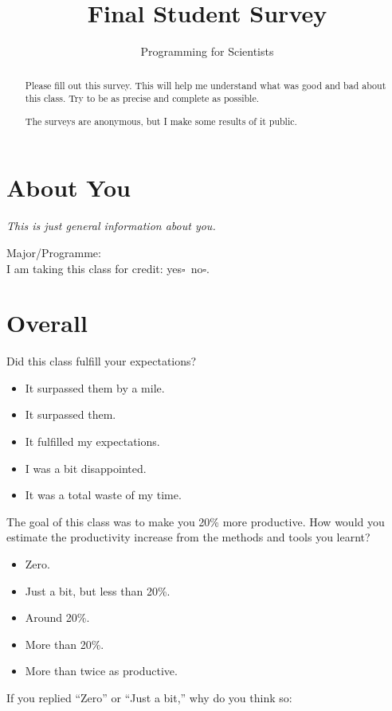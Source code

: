 \documentclass[article,twoside]{memoir}
\title{Final Student Survey}
\author{Programming for Scientists}
\newcommand*{\fillunderscore}{~\hrulefill}
\newcommand*{\checkbox}{$\square$}
\newcommand*{\yesno}{\hfill\mbox{yes\checkbox~no\checkbox}}
\newcommand{\header}[1]{\textsl{#1}}
\begin{document}
\maketitle
\begin{abstract}
Please fill out this survey. This will help me understand what was good and bad about this class. Try to be as precise and complete as possible.

The surveys are anonymous, but I make some results of it public.
\end{abstract}

\chapter{About You}

\header{This is just general information about you.}

Major/Programme: \fillunderscore\\
I am taking this class for credit: \yesno.

\chapter{Overall}

Did this class fulfill your expectations?
\begin{itemize}[\checkbox]
\item It surpassed them by a mile.
\item It surpassed them.
\item It fulfilled my expectations.
\item I was a bit disappointed.
\item It was a total waste of my time.
\end{itemize}

The goal of this class was to make you 20\% more productive. How would you estimate the productivity increase from the methods and tools you learnt?

\begin{itemize}[\checkbox]
\item Zero.
\item Just a bit, but less than 20\%.
\item Around 20\%.
\item More than 20\%.
\item More than twice as productive.
\end{itemize}

If you replied ``Zero'' or ``Just a bit,'' why do you think so:
\end{document}
